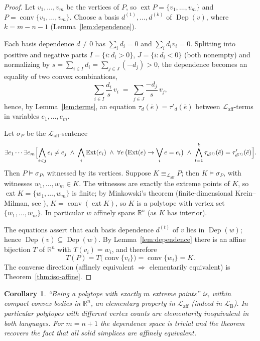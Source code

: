 \documentclass[11pt]{amsart}
\newtheorem{corollary}[theorem]{Corollary}
\theoremstyle{definition}
\newcommand{\R}{\mathbb{R}}
\newcommand{\Laff}{\mathcal{L}_{\mathrm{aff}}}
\newcommand{\LB}{\mathcal{L}_{\mathrm{B}}}
\newcommand{\Ext}{\operatorname{Ext}}
\newcommand{\Dep}{\operatorname{Dep}}
\newcommand{\conv}{\operatorname{conv}}
\newcommand{\ext}{\operatorname{ext}}
\begin{document}
\begin{proof}
Let $v_1,\dots,v_m$ be the vertices of $P$, so $\ext P=\{v_1,\dots,v_m\}$
and $P=\conv\{v_1,\dots,v_m\}$. Choose a basis $d^{(1)},\dots,d^{(k)}$ of
$\Dep(v)$, where $k=m-n-1$ (Lemma~\ref{lem:dependence}).

Each basis dependence $d\ne0$ has $\sum_i d_i=0$ and $\sum_i d_i v_i=0$.
Splitting into positive and negative parts $I=\{i:d_i>0\}$,
$J=\{i:d_i<0\}$ (both nonempty) and normalizing by
$s=\sum_{i\in I}d_i=\sum_{j\in J}(-d_j)>0$, the dependence becomes an
equality of two convex combinations,
\[
\sum_{i\in I}\frac{d_i}{s}\,v_i \;=\;\sum_{j\in J}\frac{-d_j}{s}\,v_j ,
\]
hence, by Lemma~\ref{lem:terms}, an equation $\tau_d(\bar e)=\tau'_d(\bar e)$
between $\Laff$-terms in variables $e_1,\dots,e_m$.

Let $\sigma_P$ be the $\Laff$-sentence
\[
\exists e_1\cdots\exists e_m\Bigl[\bigwedge_{i<j}e_i\ne e_j
\;\wedge\;\bigwedge_i\Ext(e_i)
\;\wedge\;\forall e\,\bigl(\Ext(e)\to\bigvee_i e=e_i\bigr)
\;\wedge\;\bigwedge_{t=1}^{k}\tau_{d^{(t)}}(\bar e)=\tau'_{d^{(t)}}(\bar e)
\Bigr].
\]
Then $P\models\sigma_P$, witnessed by its vertices. Suppose
$K\equiv_{\Laff}P$; then $K\models\sigma_P$, with witnesses
$w_1,\dots,w_m\in K$. The witnesses are exactly the extreme points of $K$,
so $\ext K=\{w_1,\dots,w_m\}$ is finite; by Minkowski's theorem
(finite-dimensional Krein--Milman, see \cite[Cor.~1.4.5]{Schneider14}),
$K=\conv(\ext K)$, so $K$ is a polytope with vertex set
$\{w_1,\dots,w_m\}$. In particular $w$ affinely spans $\R^n$ (as $K$ has
interior).

The equations assert that each basis dependence $d^{(t)}$ of $v$ lies in
$\Dep(w)$; hence $\Dep(v)\subseteq\Dep(w)$. By Lemma~\ref{lem:dependence}
there is an affine bijection $T$ of $\R^n$ with $T(v_i)=w_i$, and therefore
\[
T(P)=T\bigl(\conv\{v_i\}\bigr)=\conv\{w_i\}=K .
\]
The converse direction (affinely equivalent $\Rightarrow$ elementarily
equivalent) is Theorem~\ref{thm:iso-affine}.
\end{proof}

\begin{corollary}\label{cor:polygoncount}
``Being a polytope with exactly $m$ extreme points'' is, within compact
convex bodies in $\R^n$, an elementary property in $\Laff$ (indeed in
$\LB$). In particular polytopes with different vertex counts are
elementarily inequivalent in both languages. For $m=n+1$ the dependence
space is trivial and the theorem recovers the fact that all solid simplices
are affinely equivalent.
\end{corollary}
\end{document}
